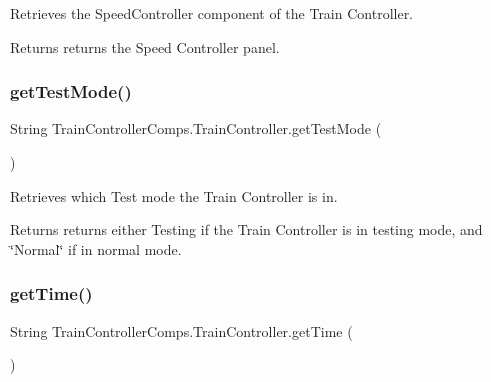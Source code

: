 Retrieves the Speed\+Controller component of the Train Controller. 

\begin{DoxyReturn}{Returns}
returns the Speed Controller panel. 
\end{DoxyReturn}
\mbox{\label{classTrainControllerComps_1_1TrainController_ad99a5958c029bc81fd2f28b386c7699e}} 
\subsubsection{\texorpdfstring{get\+Test\+Mode()}{getTestMode()}}
{\footnotesize\ttfamily String Train\+Controller\+Comps.\+Train\+Controller.\+get\+Test\+Mode (\begin{DoxyParamCaption}{ }\end{DoxyParamCaption})}



Retrieves which Test mode the Train Controller is in. 

\begin{DoxyReturn}{Returns}
returns either Testing if the Train Controller is in testing mode, and \char`\"{}\+Normal\char`\"{} if in normal mode. 
\end{DoxyReturn}
\mbox{\label{classTrainControllerComps_1_1TrainController_a3f90a62fe4293ebe0f23e7b2e0d5eb69}} 
\subsubsection{\texorpdfstring{get\+Time()}{getTime()}}
{\footnotesize\ttfamily String Train\+Controller\+Comps.\+Train\+Controller.\+get\+Time (\begin{DoxyParamCaption}{ }\end{DoxyParamCaption})\hspace{0.3cm}{\ttfamily [private]}}



